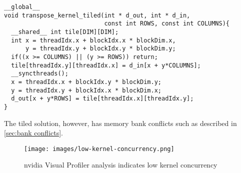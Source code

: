 \begin{lstlisting}[caption={Tiled transpose}, label={lst:transpose tiled}]
__global__
void transpose_kernel_tiled(int * d_out, int * d_in,
                            const int ROWS, const int COLUMNS){
  __shared__ int tile[DIM][DIM]; 
  int x = threadIdx.x + blockIdx.x * blockDim.x,
      y = threadIdx.y + blockIdx.y * blockDim.y;
  if((x >= COLUMNS) || (y >= ROWS)) return;
  tile[threadIdx.y][threadIdx.x] = d_in[x + y*COLUMNS];
  __syncthreads();
  x = threadIdx.x + blockIdx.y * blockDim.y;
  y = threadIdx.y + blockIdx.x * blockDim.x;
  d_out[x + y*ROWS] = tile[threadIdx.x][threadIdx.y];
}
\end{lstlisting}

The tiled solution, however, has memory bank conflicts such as described in \cref{sec:bank conflicts}.

\begin{figure}[htb]
  \centering
  \texttt{[image: images/low-kernel-concurrency.png]}
  \caption{nvidia Visual Profiler analysis indicates low kernel concurrency}
  \label{fig:first impl}
\end{figure}
